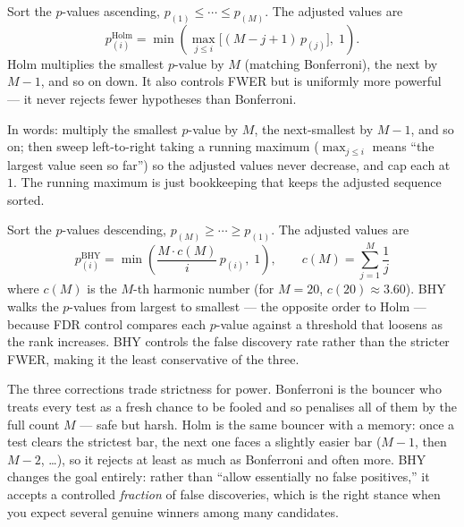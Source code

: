 \begin{definition}
Sort the $p$-values ascending, $p_{(1)} \le \cdots \le p_{(M)}$. The adjusted values are
\begin{equation}
\label{eq:eval-holm}
p_{(i)}^{\text{Holm}} = \min\!\left(\max_{j \le i}\bigl[(M - j + 1)\,p_{(j)}\bigr],\; 1\right).
\end{equation}
Holm multiplies the smallest $p$-value by $M$ (matching Bonferroni), the next by $M-1$, and so on down. It also controls FWER but is uniformly more powerful --- it never rejects fewer hypotheses than Bonferroni.

In words: multiply the smallest $p$-value by $M$, the next-smallest by $M-1$, and so on; then sweep left-to-right taking a running maximum ($\max_{j\le i}$ means ``the largest value seen so far'') so the adjusted values never decrease, and cap each at $1$. The running maximum is just bookkeeping that keeps the adjusted sequence sorted.
\end{definition}

\begin{definition}
Sort the $p$-values descending, $p_{(M)} \ge \cdots \ge p_{(1)}$. The adjusted values are
\begin{equation}
\label{eq:eval-bhy}
p_{(i)}^{\text{BHY}} = \min\!\left(\frac{M \cdot c(M)}{i}\,p_{(i)},\; 1\right),
\qquad c(M) = \sum_{j=1}^{M}\frac{1}{j}
\end{equation}
where $c(M)$ is the $M$-th harmonic number (for $M=20$, $c(20)\approx 3.60$).
BHY walks the $p$-values from largest to smallest --- the opposite order to Holm --- because FDR control compares each $p$-value against a threshold that loosens as the rank increases.
BHY controls the false discovery rate rather than the stricter FWER, making it the least conservative of the three.
\end{definition}

\begin{intuition}
The three corrections trade strictness for power.
Bonferroni is the bouncer who treats every test as a fresh chance to be fooled and so penalises all of them by the full count $M$ --- safe but harsh.
Holm is the same bouncer with a memory: once a test clears the strictest bar, the next one faces a slightly easier bar ($M-1$, then $M-2$, \ldots), so it rejects at least as much as Bonferroni and often more.
BHY changes the goal entirely: rather than ``allow essentially no false positives,'' it accepts a controlled \emph{fraction} of false discoveries, which is the right stance when you expect several genuine winners among many candidates.
\end{intuition}

